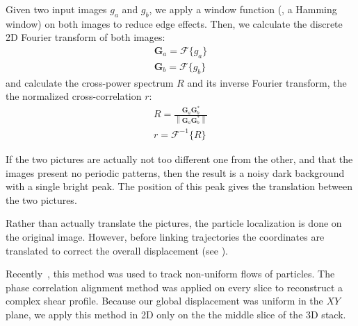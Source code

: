 Given two input images $g_a$ and $g_b$, we apply a window function (, a Hamming window) on both images to reduce edge effects. Then, we calculate the discrete 2D Fourier transform of both images:
\begin{align}
\mathbf{G}_a = \mathcal{F}\{g_a\} \\
\mathbf{G}_b = \mathcal{F}\{g_b\}
\end{align}
and calculate the cross-power spectrum $R$ and its inverse Fourier transform, the the normalized cross-correlation $r$:
\begin{align}
    R = \frac{ \mathbf{G}_a \mathbf{G}_b^*}{\left\|\mathbf{G}_a \mathbf{G}_b^*\right\|} \\
    r = \mathcal{F}^{-1}\{R\} 
\end{align}

If the two pictures are actually not too different one from the other, and that the images present no periodic patterns, then the result is a noisy dark background with a single bright peak. The position of this peak gives the translation between the two pictures.

Rather than actually translate the pictures, the particle localization is done on the original image. However, before linking trajectories the coordinates are translated to correct the overall displacement (see ).

Recently~\citep{Besseling2009}, this method was used to track non-uniform flows of particles. The phase correlation alignment method was applied on every slice to reconstruct a complex shear profile. Because our global displacement was uniform in the $XY$ plane, we apply this method in 2D only on the the middle slice of the 3D stack.
%
%